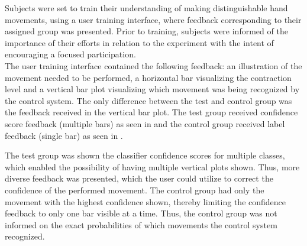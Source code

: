 

Subjects were set to train their understanding of making distinguishable hand movements, using a user training interface, where feedback corresponding to their assigned group was presented. Prior to training, subjects were informed of the importance of their efforts in relation to the experiment with the intent of encouraging a focused participation. \\
The user training interface contained the following feedback: an illustration of the movement needed to be performed, a horizontal bar visualizing the contraction level and a vertical bar plot visualizing which movement was being recognized by the control system. The only difference between the test and control group was the feedback received in the vertical bar plot. The test group received confidence score feedback (multiple bars) as seen in  and the control group received label feedback (single bar) as seen in .

The test group was shown the classifier confidence scores for multiple classes, which enabled the possibility of having multiple vertical plots shown. Thus, more diverse feedback was presented, which the user could utilize to correct the confidence of the performed movement. The control group had only the movement with the highest confidence shown, thereby limiting the confidence feedback to only one bar visible at a time. Thus, the control group was not informed on the exact probabilities of which movements the control system recognized.  




